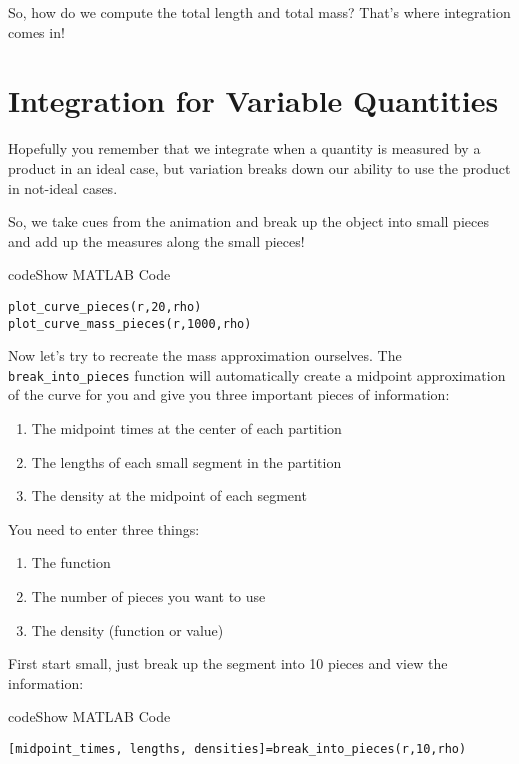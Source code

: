 \documentclass{ximera}
\begin{document}
So, how do we compute the total length and total mass? That's where integration comes in!

\section*{Integration for Variable Quantities}

Hopefully you remember that we integrate when a quantity is measured by a product in an ideal case, but variation breaks down our ability to use the product in not-ideal cases. 

So, we take cues from the animation and break up the object into small pieces and add up the measures along the small pieces!

\begin{expandable}{code}{Show MATLAB Code}
\begin{verbatim}
plot_curve_pieces(r,20,rho)
plot_curve_mass_pieces(r,1000,rho)
\end{verbatim}
\end{expandable}

Now let's try to recreate the mass approximation ourselves. The \texttt{break\_into\_pieces} function will automatically create a midpoint approximation of the curve for you and give you three important pieces of information: 
\begin{enumerate}
\item The midpoint times at the center of each partition 
\item The lengths of each small segment in the partition
\item The density at the midpoint of each segment
\end{enumerate}

You need to enter three things: 
\begin{enumerate}
\item The function
\item The number of pieces you want to use
\item The density (function or value)
\end{enumerate}

First start small, just break up the segment into 10 pieces and view the information:

\begin{expandable}{code}{Show MATLAB Code}
\begin{verbatim}
[midpoint_times, lengths, densities]=break_into_pieces(r,10,rho)
\end{verbatim}
\end{expandable}
\end{document}

